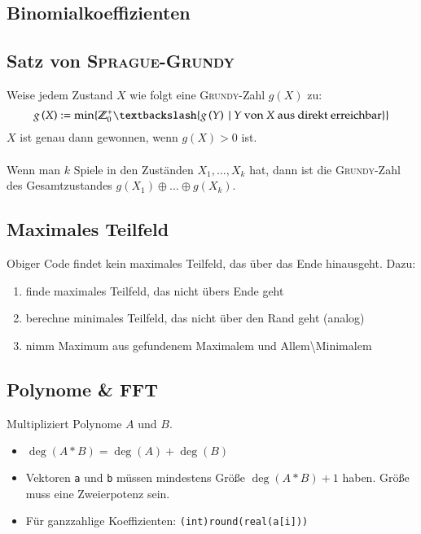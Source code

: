 \subsection{Binomialkoeffizienten}


\subsection{Satz von \textsc{Sprague-Grundy}}
Weise jedem Zustand $X$ wie folgt eine \textsc{Grundy}-Zahl $g\left(X\right)$ zu:
\[
	g\left(X\right) := \min\{ \mathbb{Z}_0^+ \textbackslash \{g\left(Y\right)~|~Y \text{ von } X \text{ aus direkt erreichbar}\}\} 
\]
$X$ ist genau dann gewonnen, wenn $g\left(X\right) > 0$ ist.\\\\
Wenn man $k$ Spiele in den Zuständen $X_1, \ldots, X_k$ hat, dann ist die \textsc{Grundy}-Zahl des Gesamtzustandes $g\left(X_1\right) \oplus \ldots \oplus g\left(X_k\right)$.


\subsection{Maximales Teilfeld}

Obiger Code findet kein maximales Teilfeld, das über das Ende hinausgeht. Dazu:
\begin{enumerate}
	\item finde maximales Teilfeld, das nicht übers Ende geht
	\item berechne minimales Teilfeld, das nicht über den Rand geht (analog)
	\item nimm Maximum aus gefundenem Maximalem und Allem\textbackslash Minimalem
\end{enumerate}

\subsection{Polynome \& FFT}
Multipliziert Polynome $A$ und $B$.
\begin{itemize}
	\item $\deg(A * B) = \deg(A) + \deg(B)$
	\item Vektoren \lstinline{a} und \lstinline{b} müssen mindestens Größe $\deg(A * B) + 1$ haben.
	Größe muss eine Zweierpotenz sein.
	\item Für ganzzahlige Koeffizienten: \lstinline{(int)round(real(a[i]))}
\end{itemize}


